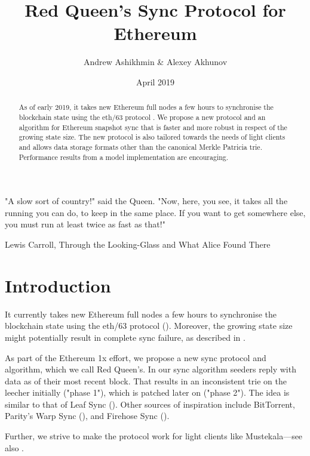 \documentclass{amsart}
\begin{document}
\pagecolor{white}

\title{Red Queen's Sync Protocol for Ethereum}
\author{Andrew Ashikhmin \& Alexey Akhunov}
\date{April 2019}

\begin{abstract}
    As of early 2019, it takes new Ethereum full nodes a few hours
    to synchronise the blockchain state using the eth/63 protocol \cite{wire_protocol}.
    We propose a new protocol and an algorithm for Ethereum snapshot sync
    that is faster and more robust in respect of the growing state size.
    The new protocol is also tailored towards the needs of light clients
    and allows data storage formats other than the canonical Merkle Patricia trie.
    Performance results from a model implementation are encouraging.
\end{abstract}

\maketitle

\epigraph{
    "A slow sort of country!" said the Queen.
    "Now, here, you see, it takes all the running you can do, to keep in the same place.
    If you want to get somewhere else, you must run at least twice as fast as that!"
    }{Lewis Carroll, Through the Looking-Glass and What Alice Found There}

\section{Introduction}

It currently takes new Ethereum full nodes a few hours
to synchronise the blockchain state using the eth/63 protocol (\cite{wire_protocol}).
Moreover, the growing state size might potentially result in complete sync failure,
as described in \cite{akhunov_1x_workshop_part1}.

As part of the Ethereum 1x effort, we propose a new sync protocol and algorithm,
which we call Red Queen's.
In our sync algorithm seeders reply with data as of their most recent block.
That results in an inconsistent trie on the leecher initially ("phase 1"),
which is patched later on ("phase 2").
The idea is similar to that of Leaf Sync (\cite{leaf_sync}).
Other sources of inspiration include BitTorrent, Parity's Warp Sync (\cite{warp_sync}),
and Firehose Sync (\cite{firehose}).

Further, we strive to make the protocol work for light clients like Mustekala---see also \cite{light_client_protocol}.
\end{document}
